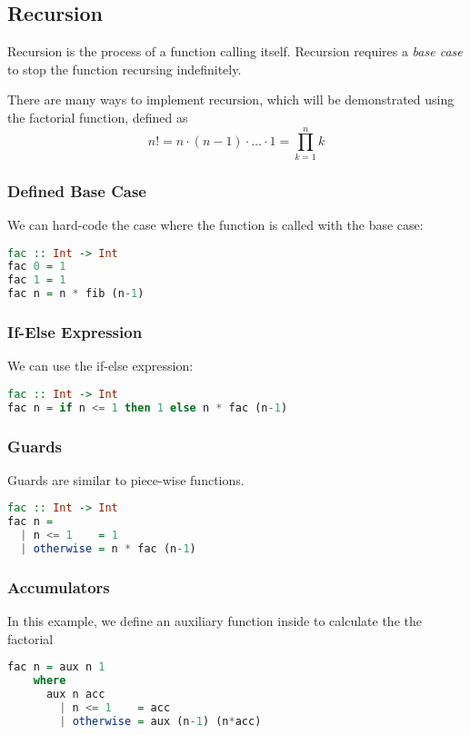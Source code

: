 \subsection{Recursion}
Recursion is the process of a function calling itself. Recursion requires a \textit{base case} to stop the function recursing indefinitely.

There are many ways to implement recursion, which will be demonstrated using the factorial function, defined as
\[n! = n \cdot (n - 1) \cdot \ldots \cdot 1 = \prod_{k = 1}^{n} k\]

\subsubsection{Defined Base Case}
We can hard-code the case where the function is called with the base case:

\begin{lstlisting}[language=haskell]
fac :: Int -> Int
fac 0 = 1
fac 1 = 1
fac n = n * fib (n-1) 
\end{lstlisting}

\subsubsection{If-Else Expression}
We can use the if-else expression:
\begin{lstlisting}[language=haskell]
fac :: Int -> Int
fac n = if n <= 1 then 1 else n * fac (n-1)
\end{lstlisting}

\subsubsection{Guards}
Guards are similar to piece-wise functions.
\begin{lstlisting}[language=haskell]
fac :: Int -> Int
fac n =
  | n <= 1    = 1
  | otherwise = n * fac (n-1)
\end{lstlisting}

\subsubsection{Accumulators}
In this example, we define an auxiliary function \texttt{} inside \texttt{} to calculate the the factorial

\begin{lstlisting}[language=haskell]
  fac n = aux n 1
    where
      aux n acc
        | n <= 1    = acc
        | otherwise = aux (n-1) (n*acc)
\end{lstlisting}

